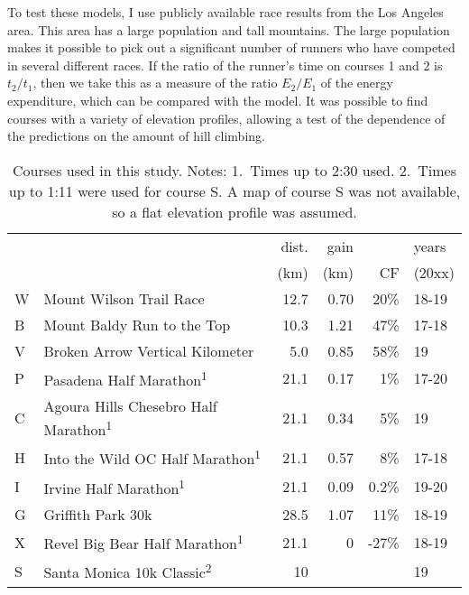\documentclass[10pt,letterpaper]{article}
\begin{document}
To test these models, I use publicly available race results from the Los Angeles area.
This area has a large population and tall mountains. The large population makes it possible
to pick out a significant number of runners who have competed in several different races.
If the ratio of the runner's time on courses 1 and 2 is $t_2/t_1$, then we take this
as a measure of the ratio $E_2/E_1$ of the energy expenditure, which can be compared with
the model. It was possible to find courses with a variety of elevation profiles, allowing
a test of the dependence of the predictions on the amount of hill climbing.

\begin{table}[h]\label{table:courses}
\caption{Courses used in this study. Notes: 1.~Times up to 2:30 used. 
2.~Times up to 1:11 were used for course S. A map of course S was not available, so a flat elevation profile was
assumed.
}
\begin{tabular}{lp{60mm}rrrl}
                 &       & dist.  & gain &  &  years \\
                 &       & (km)      &  (km) & CF & (20xx) \\
W & Mount Wilson Trail Race         & 12.7 & 0.70 & 20\%        & 18-19\\
B & Mount Baldy Run to the Top      & 10.3 & 1.21 & 47\%        & 17-18\\
V & Broken Arrow Vertical Kilometer & 5.0  & 0.85 & 58\%        & 19 \\
P & Pasadena Half Marathon\textsuperscript{1}
                                    & 21.1 & 0.17 & 1\%         & 17-20 \\
C & Agoura Hills Chesebro Half Marathon\textsuperscript{1}
                                    & 21.1 & 0.34 & 5\%     & 19 \\
H & Into the Wild OC Half Marathon\textsuperscript{1}
                                    & 21.1 & 0.57 & 8\% & 17-18\\
I & Irvine Half Marathon\textsuperscript{1}
                                    & 21.1 & 0.09 & 0.2\% & 19-20\\
G & Griffith Park 30k
                                    & 28.5 & 1.07 & 11\%        & 18-19 \\
X & Revel Big Bear Half Marathon\textsuperscript{1}
                                    & 21.1 & 0    & -27\% & 18-19 \\
S & Santa Monica 10k Classic\textsuperscript{2}        & 10 & & & 19\\
\end{tabular}
\label{table:courses}
\end{table}
\end{document}
